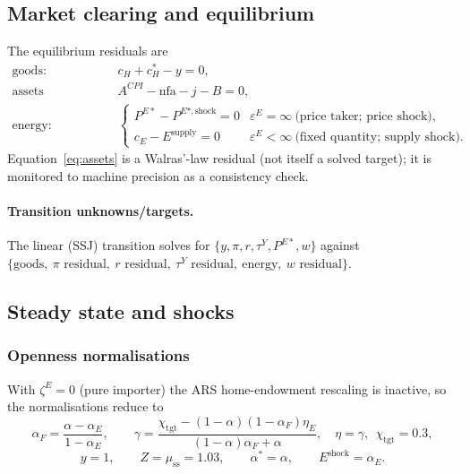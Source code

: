 \documentclass[11pt,a4paper]{article}
\newcommand{\stst}{\mathrm{ss}}
\begin{document}
\subsection{Market clearing and equilibrium}\label{sec:clearing}

The equilibrium residuals are
\begin{align}
\text{goods:}&\quad c_H+c_H^{*}-y=0, \label{eq:goods}\\
\text{assets (Walras):}&\quad A^{CPI}-\mathrm{nfa}-j-B=0, \label{eq:assets}\\
\text{energy:}&\quad
\begin{cases}
P^{E*}-P^{E*,\text{shock}}=0 & \varepsilon^{E}=\infty\ \text{(price taker; price shock)},\\
c_E-E^{\text{supply}}=0 & \varepsilon^{E}<\infty\ \text{(fixed quantity; supply shock).}
\end{cases}\label{eq:energy}
\end{align}
Equation~\eqref{eq:assets} is a Walras'-law residual (not itself a solved
target); it is monitored to machine precision as a consistency check.

\paragraph{Transition unknowns/targets.} The linear (SSJ) transition solves for
$\{y,\pi,r,\tau^{Y},P^{E*},w\}$ against
$\{\text{goods},\ \pi\text{ residual},\ r\text{ residual},\ \tau^{Y}\text{ residual},
\ \text{energy},\ w\text{ residual}\}$.

\subsection{Steady state and shocks}\label{sec:ss}

\subsubsection{Openness normalisations}

With $\zeta^{E}=0$ (pure importer) the ARS home-endowment rescaling is inactive,
so the normalisations reduce to
\begin{equation}
\alpha_F=\frac{\alpha-\alpha_E}{1-\alpha_E},\qquad
\gamma=\frac{\chi_{\text{tgt}}-(1-\alpha)(1-\alpha_F)\eta_E}{(1-\alpha)\alpha_F+\alpha},\quad \eta=\gamma,\ \ \chi_{\text{tgt}}=0.3,
\end{equation}
\begin{equation}
y=1,\qquad Z=\mu_{\stst}=1.03,\qquad \alpha^{*}=\alpha,\qquad E^{\text{shock}}=\alpha_E .
\end{equation}
\end{document}
